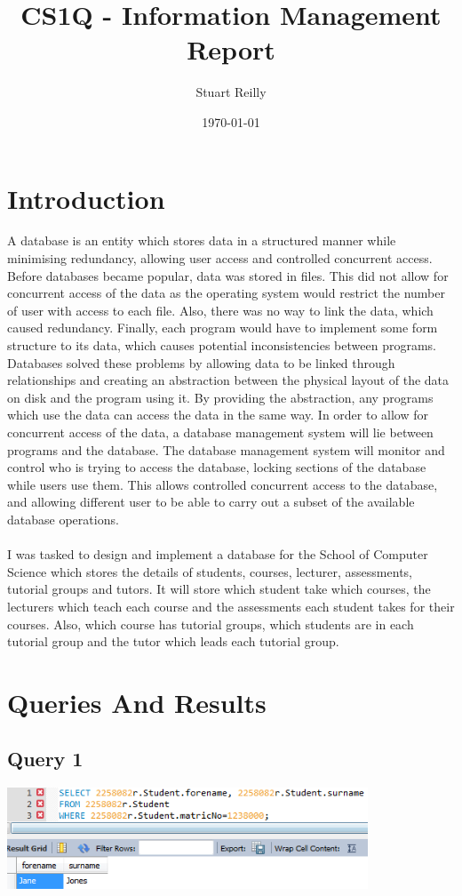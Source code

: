 \documentclass[12pt]{article}
\author{Stuart Reilly}
\date{\today}
\title{CS1Q - Information Management Report}
\begin{document}
\maketitle

\newpage
\tableofcontents

\newpage

\section{Introduction}
A database is an entity which stores data in a structured manner while minimising redundancy, allowing user access and controlled concurrent access.
Before databases became popular, data was stored in files.
This did not allow for concurrent access of the data as the operating system would restrict the number of user with access to each file.
Also, there was no way to link the data, which caused redundancy.
Finally, each program would have to implement some form structure to its data, which causes potential inconsistencies between programs.
Databases solved these problems by allowing data to be linked through relationships and creating an abstraction between the physical layout of the data on disk and the program using it.
By providing the abstraction, any programs which use the data can access the data in the same way.
In order to allow for concurrent access of the data, a database management system will lie between programs and the database.
The database management system will monitor and control who is trying to access the database, locking sections of the database while users use them.
This allows controlled concurrent access to the database, and allowing different user to be able to carry out a subset of the available database operations.
\\
\\
I was tasked to design and implement a database for the School of Computer Science which stores the details of students, courses, lecturer, assessments, tutorial groups and tutors.
It will store which student take which courses, the lecturers which teach each course and the assessments each student takes for their courses.
Also, which course has tutorial groups, which students are in each tutorial group and the tutor which leads each tutorial group.

\section{Queries And Results}
\subsection{Query 1}
\includegraphics[width=\linewidth,height=3cm,keepaspectratio]{query/Query1}
\end{document}
